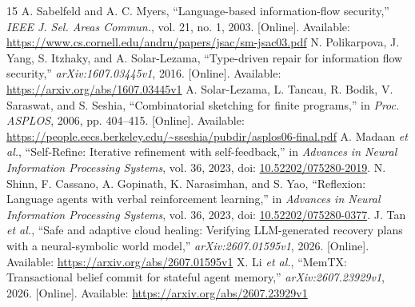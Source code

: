 \begin{thebibliography}{15}
 A. Sabelfeld and A. C. Myers, ``Language-based information-flow security,'' \emph{IEEE J. Sel. Areas Commun.}, vol. 21, no. 1, 2003. [Online]. Available: \url{https://www.cs.cornell.edu/andru/papers/jsac/sm-jsac03.pdf}
 N. Polikarpova, J. Yang, S. Itzhaky, and A. Solar-Lezama, ``Type-driven repair for information flow security,'' \emph{arXiv:1607.03445v1}, 2016. [Online]. Available: \url{https://arxiv.org/abs/1607.03445v1}
 A. Solar-Lezama, L. Tancau, R. Bodik, V. Saraswat, and S. Seshia, ``Combinatorial sketching for finite programs,'' in \emph{Proc. ASPLOS}, 2006, pp. 404--415. [Online]. Available: \url{https://people.eecs.berkeley.edu/~sseshia/pubdir/asplos06-final.pdf}
 A. Madaan \emph{et al.}, ``Self-Refine: Iterative refinement with self-feedback,'' in \emph{Advances in Neural Information Processing Systems}, vol. 36, 2023, doi: \href{https://doi.org/10.52202/075280-2019}{10.52202/075280-2019}.
 N. Shinn, F. Cassano, A. Gopinath, K. Narasimhan, and S. Yao, ``Reflexion: Language agents with verbal reinforcement learning,'' in \emph{Advances in Neural Information Processing Systems}, vol. 36, 2023, doi: \href{https://doi.org/10.52202/075280-0377}{10.52202/075280-0377}.
 J. Tan \emph{et al.}, ``Safe and adaptive cloud healing: Verifying LLM-generated recovery plans with a neural-symbolic world model,'' \emph{arXiv:2607.01595v1}, 2026. [Online]. Available: \url{https://arxiv.org/abs/2607.01595v1}
 X. Li \emph{et al.}, ``MemTX: Transactional belief commit for stateful agent memory,'' \emph{arXiv:2607.23929v1}, 2026. [Online]. Available: \url{https://arxiv.org/abs/2607.23929v1}
\end{thebibliography}
